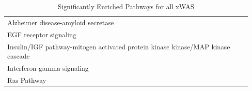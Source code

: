 \begin{table}[H]\centering
\caption{Significantly Enriched Pathways for all xWAS}
  \begin{tabular}{lr}
    \toprule
		Alzheimer disease-amyloid secretase  \\
		EGF receptor signaling   \\
		Insulin/IGF pathway-mitogen activated protein kinase kinase/MAP kinase cascade   \\
		Interferon-gamma signaling   \\
		Ras Pathway   \\
    \bottomrule
  \end{tabular}
  \label{tab:allenriched}
\end{table}


